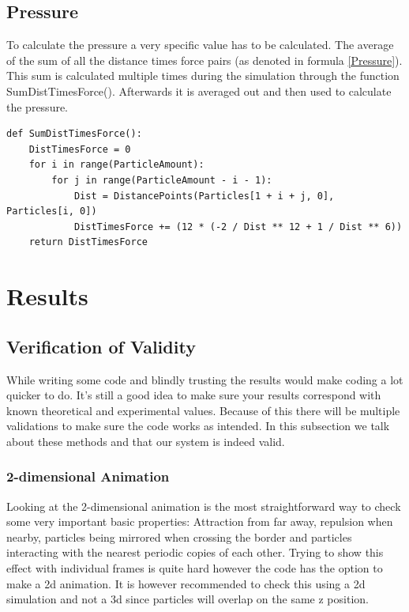 \documentclass[a4paper,12pt]{article} %
\begin{document}
\subsection{Pressure}
To calculate the pressure a very specific value has to be calculated. The average of the sum of all the distance times force pairs (as denoted in formula \eqref{Pressure}). This sum is calculated multiple times during the simulation through the function SumDistTimesForce(). Afterwards it is averaged out and then used to calculate the pressure.\par
\newpage
\small
\begin{lstlisting}
def SumDistTimesForce():
    DistTimesForce = 0
    for i in range(ParticleAmount):
        for j in range(ParticleAmount - i - 1):
            Dist = DistancePoints(Particles[1 + i + j, 0], Particles[i, 0])
            DistTimesForce += (12 * (-2 / Dist ** 12 + 1 / Dist ** 6))
    return DistTimesForce

\end{lstlisting}
\normalsize
\newpage
\section{Results}
\label{Results}
\subsection{Verification of Validity}
While writing some code and blindly trusting the results would make coding a lot quicker to do. It's still a good idea to make sure your results correspond with known theoretical and experimental values. Because of this there will be multiple validations to make sure the code works as intended. In this subsection we talk about these methods and that our system is indeed valid.
\subsubsection{2-dimensional Animation}
Looking at the 2-dimensional animation is the most straightforward way to check some very important basic properties: Attraction from far away, repulsion when nearby, particles being mirrored when crossing the border and particles interacting with the nearest periodic copies of each other. Trying to show this effect with individual frames is quite hard however the code has the option to make a 2d animation. It is however recommended to check this using a 2d simulation and not a 3d since particles will overlap on the same z position.
\end{document}
